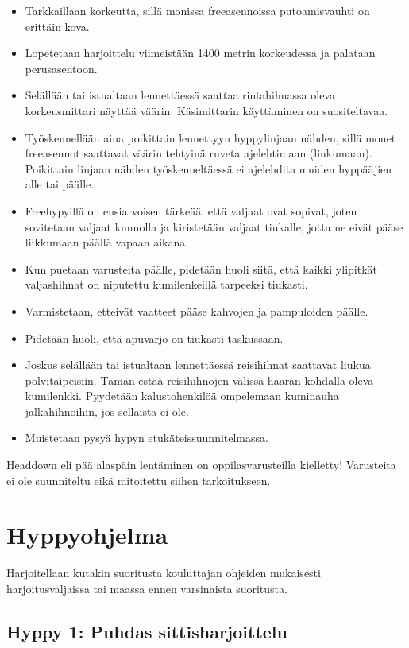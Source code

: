 \begin{itemize}
\item  Tarkkaillaan korkeutta, sillä monissa freeasennoissa putoamisvauhti on erittäin kova. 
\item  Lopetetaan harjoittelu viimeistään 1400 metrin korkeudessa ja palataan perusasentoon. 
\item  Selällään tai istualtaan lennettäessä saattaa rintahihnassa oleva korkeusmittari näyttää väärin. Käsimittarin käyttäminen on suositeltavaa. 
\item  Työskennellään aina poikittain lennettyyn hyppylinjaan nähden, sillä monet freeasennot saattavat väärin tehtyinä ruveta ajelehtimaan (liukumaan). Poikittain linjaan nähden työskenneltäessä ei ajelehdita muiden hyppääjien alle tai päälle. 
\item  Freehypyillä on ensiarvoisen tärkeää, että valjaat ovat sopivat, joten sovitetaan valjaat kunnolla ja kiristetään valjaat tiukalle, jotta ne eivät pääse liikkumaan päällä vapaan aikana. 
\item  Kun puetaan varusteita päälle, pidetään huoli siitä, että kaikki ylipitkät valjashihnat on niputettu kumilenkeillä tarpeeksi tiukasti. 
\item  Varmistetaan, etteivät vaatteet pääse kahvojen ja pampuloiden päälle. 
\item  Pidetään huoli, että apuvarjo on tiukasti taskussaan. 
\item  Joskus selällään tai istualtaan lennettäessä reisihihnat saattavat liukua polvitaipeisiin. Tämän estää reisihihnojen välissä haaran kohdalla oleva kumilenkki. Pyydetään kalustohenkilöä ompelemaan kuminauha jalkahihnoihin, jos sellaista ei ole. 
\item  Muistetaan pysyä hypyn etukäteissuunnitelmassa. 
\end{itemize}

Headdown eli pää alaspäin lentäminen on oppilasvarusteilla kielletty! Varusteita ei ole suunniteltu eikä mitoitettu siihen tarkoitukseen. 

\section{ Hyppyohjelma }
\label{free-hyppaaminen-hyppyohjelma}


Harjoitellaan kutakin suoritusta kouluttajan ohjeiden mukaisesti harjoitusvaljaissa tai maassa ennen varsinaista suoritusta. 

\subsection{ Hyppy 1: Puhdas sittisharjoittelu }
\label{free-hyppaaminen-hyppy-1-puhdas-sittisharjoittelu}


